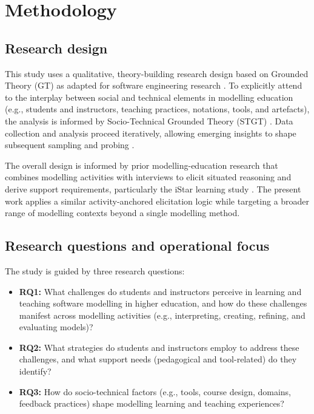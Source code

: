 
%

\chapter{Methodology}
\label{cha:methodology}

\section{Research design}
\label{sec:method_design}

This study uses a qualitative, theory-building research design based on Grounded Theory (GT) as adapted for software engineering research \cite{adolph2011using,stol2016grounded}. To explicitly attend to the interplay between social and technical elements in modelling education (e.g., students and instructors, teaching practices, notations, tools, and artefacts), the analysis is informed by Socio-Technical Grounded Theory (STGT) \cite{hoda2018socio}. Data collection and analysis proceed iteratively, allowing emerging insights to shape subsequent sampling and probing \cite{adolph2011using,stol2016grounded}.

The overall design is informed by prior modelling-education research that combines modelling activities with interviews to elicit situated reasoning and derive support requirements, particularly the iStar learning study \cite{istar-learning}. The present work applies a similar activity-anchored elicitation logic while targeting a broader range of modelling contexts beyond a single modelling method.

\section{Research questions and operational focus}
\label{sec:method_rq}

The study is guided by three research questions:

\begin{itemize}
    \item \textbf{RQ1:} What challenges do students and instructors perceive in learning and teaching software modelling in higher education, and how do these challenges manifest across modelling activities (e.g., interpreting, creating, refining, and evaluating models)?
    \item \textbf{RQ2:} What strategies do students and instructors employ to address these challenges, and what support needs (pedagogical and tool-related) do they identify?
    \item \textbf{RQ3:} How do socio-technical factors (e.g., tools, course design, domains, feedback practices) shape modelling learning and teaching experiences?
\end{itemize}

